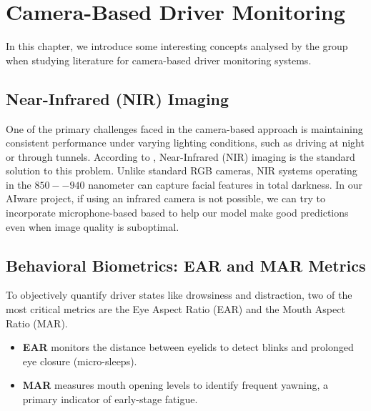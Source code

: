 \chapter{Camera-Based Driver Monitoring} \label{cap:conceitos}


In this chapter, we introduce some interesting concepts analysed by the group when studying literature for camera-based driver monitoring systems.

\section{Near-Infrared (NIR) Imaging}

One of the primary challenges faced in the camera-based approach is maintaining consistent performance under varying lighting conditions, such as driving at night or through tunnels. According to \cite{review}, Near-Infrared (NIR) imaging is the standard solution to this problem. Unlike standard RGB cameras, NIR systems operating in the $850--940$ nanometer can capture facial features in total darkness. In our AIware project, if using an infrared camera is not possible, we can try to incorporate microphone-based based to help our model make good predictions even when image quality is suboptimal.

\section{Behavioral Biometrics: EAR and MAR Metrics}

To objectively quantify driver states like drowsiness and distraction, two of the most critical metrics are the Eye Aspect Ratio (EAR) and the Mouth Aspect Ratio (MAR).
\begin{itemize}
    \item \textbf{EAR} monitors the distance between eyelids to detect blinks and prolonged eye closure (micro-sleeps).
    \item \textbf{MAR} measures mouth opening levels to identify frequent yawning, a primary indicator of early-stage fatigue.
\end{itemize}

